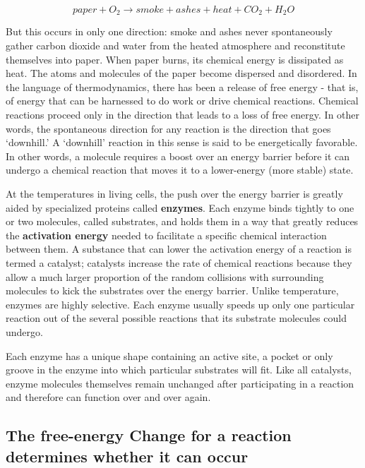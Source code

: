 \begin{equation}
paper + O_{2} \rightarrow smoke + ashes + heat + CO_{2} + H_{2}O
\end{equation}

But this occurs in only one direction: smoke and ashes never spontaneously
gather carbon dioxide and water from the heated atmosphere and
reconstitute themselves into paper. When paper burns, its chemical
energy is dissipated as heat. The atoms
and molecules of the paper become dispersed and disordered. In the
language of thermodynamics, there has been a release of free energy -
that is, of energy that can be harnessed to do work or drive chemical
reactions. Chemical reactions proceed only in the direction that leads to
a loss of free energy. In other words, the spontaneous direction for any
reaction is the direction that goes ‘downhill.’ A ‘downhill’ reaction in this
sense is said to be energetically favorable.
In other words, a molecule requires a boost over an energy barrier
before it can undergo a chemical reaction that moves it to a lower-energy
(more stable) state.

At the temperatures in living cells, the push over the energy barrier is
greatly aided by specialized proteins called \textbf{enzymes}. Each enzyme binds
tightly to one or two molecules, called substrates, and holds them in
a way that greatly reduces the \textbf{activation energy} needed to facilitate a
specific chemical interaction between them. A substance
that can lower the activation energy of a reaction is termed a catalyst;
catalysts increase the rate of chemical reactions because they allow a
much larger proportion of the random collisions with surrounding molecules
to kick the substrates over the energy barrier.
Unlike temperature, enzymes are highly selective. Each enzyme usually
speeds up only one particular reaction out of the several possible reactions
that its substrate molecules could undergo.

Each enzyme has a unique shape containing an active site, a pocket or only
groove in the enzyme into which particular substrates will fit.
Like all catalysts, enzyme molecules themselves remain unchanged
after participating in a reaction and therefore can function over and over
again.

\subsection{The free-energy Change for a reaction determines whether it can occur}

